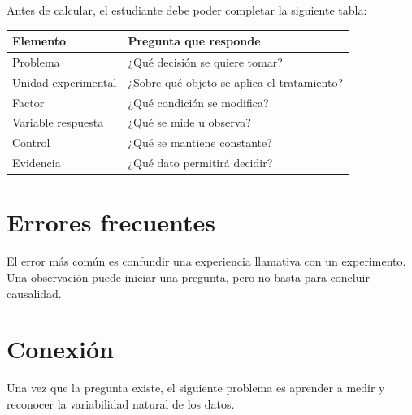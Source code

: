 Antes de calcular, el estudiante debe poder completar la siguiente tabla:

\begin{table}[H]
\centering
\begin{tabular}{p{}p{}}
\toprule
Elemento & Pregunta que responde\\
\midrule
Problema & ¿Qué decisión se quiere tomar?\\
Unidad experimental & ¿Sobre qué objeto se aplica el tratamiento?\\
Factor & ¿Qué condición se modifica?\\
Variable respuesta & ¿Qué se mide u observa?\\
Control & ¿Qué se mantiene constante?\\
Evidencia & ¿Qué dato permitirá decidir?\\
\bottomrule
\end{tabular}
\end{table}

\section{Errores frecuentes}

\begin{cuidado}
El error más común es confundir una experiencia llamativa con un experimento. Una observación puede iniciar una pregunta, pero no basta para concluir causalidad.
\end{cuidado}

\section{Conexión}

Una vez que la pregunta existe, el siguiente problema es aprender a medir y reconocer la variabilidad natural de los datos.
